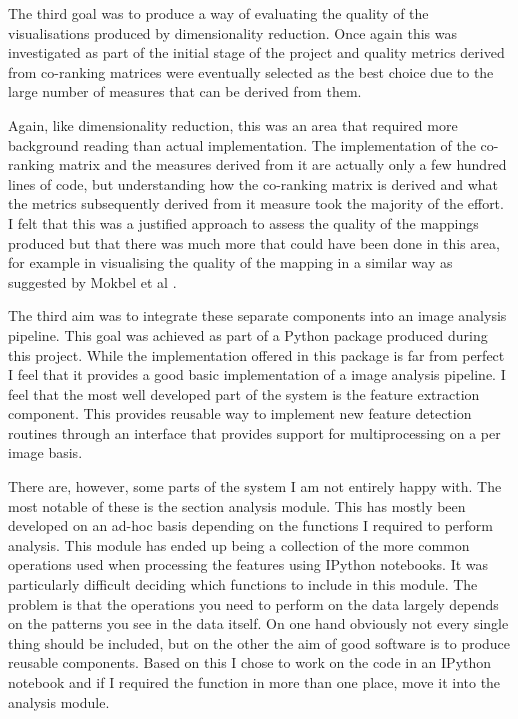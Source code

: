 The third goal was to produce a way of evaluating the quality of the visualisations produced by dimensionality reduction. Once again this was investigated as part of the initial stage of the project and quality metrics derived from co-ranking matrices were eventually selected as the best choice due to the large number of measures that can be derived from them.

Again, like dimensionality reduction, this was an area that required more background reading than actual implementation. The implementation of the co-ranking matrix and the measures derived from it are actually only a few hundred lines of code, but understanding how the co-ranking matrix is derived and what the metrics subsequently derived from it measure took the majority of the effort. I felt that this was a justified approach to assess the quality of the mappings produced but that there was much more that could have been done in this area, for example in visualising the quality of the mapping in a similar way as suggested by Mokbel et al \cite{mokbel2013visualizing}.

The third aim was to integrate these separate components into an image analysis pipeline. This goal was achieved as part of a Python package produced during this project. While the implementation offered in this package is far from perfect I feel that it provides a good basic implementation of a image analysis pipeline. I feel that the most well developed part of the system is the feature extraction component. This provides reusable way to implement new feature detection routines through an interface that provides support for multiprocessing on a per image basis.

There are, however, some parts of the system I am not entirely happy with. The most notable of these is the section analysis module. This has mostly been developed on an ad-hoc basis depending on the functions I required to perform analysis. This module has ended up being a collection of the more common operations used when processing the features using IPython notebooks. It was particularly difficult deciding which functions to include in this module. The problem is that the operations you need to perform on the data largely depends on the patterns you see in the data itself. On one hand obviously not every single thing should be included, but on the other the aim of good software is to produce reusable components. Based on this I chose to work on the code in an IPython notebook and if I required the function in more than one place, move it into the analysis module.

